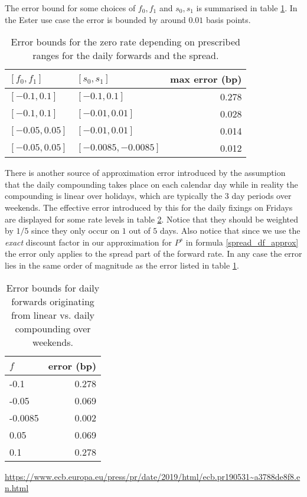 \documentclass[12pt, a4paper]{article}
\begin{document}
The error bound for some choices of $f_0, f_1$ and $s_0, s_1$ is summarised in table \ref{sample_error_bounds}. In the
Ester use case the error is bounded by around $0.01$ basis points.

\begin{table}[!htbp]
  \centering
  \begin{tabular}{l | l | r}
    $[f_0, f_1]$ & $[s_0, s_1]$ & max error (bp) \\ \hline
    $[-0.1, 0.1]$ & $[-0.1, 0.1]$ &  0.278 \\
    $[-0.1, 0.1]$ & $[-0.01, 0.01]$ &  0.028 \\
    $[-0.05, 0.05]$ & $[-0.01, 0.01]$ &  0.014 \\
    $[-0.05, 0.05]$ & $[-0.0085, -0.0085]$ &  0.012 \\
  \end{tabular}
  \caption{Error bounds for the zero rate depending on prescribed ranges for the daily forwards and the spread.}
  \label{sample_error_bounds}
\end{table}

There is another source of approximation error introduced by the assumption that the daily compounding takes place on
each calendar day while in reality the compounding is linear over holidays, which are typically the 3 day periods over
weekends. The effective error introduced by this for the daily fixings on Fridays are displayed for some rate levels in
table \ref{sample_error_weekends}. Notice that they should be weighted by $1/5$ since they only occur on $1$ out of $5$
days. Also notice that since we use the {\em exact} discount factor in our approximation for $P^s$ in formula
\ref{spread_df_approx} the error only applies to the spread part of the forward rate. In any case the error lies in the
same order of magnitude as the error listed in table \ref{sample_error_bounds}.

\begin{table}[!htbp]
  \centering
  \begin{tabular}{l | r}
    $f$ & error (bp) \\ \hline
    -0.1 & 0.278 \\
    -0.05 & 0.069 \\
    -0.0085 & 0.002 \\
    0.05 & 0.069 \\
    0.1 & 0.278 \\
  \end{tabular}
  \caption{Error bounds for daily forwards originating from linear vs. daily compounding over weekends.}
  \label{sample_error_weekends}
\end{table}

\pagebreak

\begin{thebibliography}{*}
 \url{https://www.ecb.europa.eu/press/pr/date/2019/html/ecb.pr190531~a3788de8f8.en.html}
\end{thebibliography}
  
\end{document}
